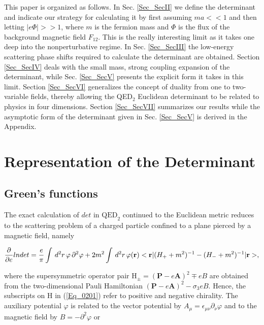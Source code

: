 \documentclass[a4paper,twocolumn,showpacs,preprintnumbers,amsmath,amssymb]{revtex4}
\newcommand{\pdo}[1]{\ensuremath{\frac{\partial }
        {\partial #1 }}}
\begin{document}
This paper is organized as follows. In Sec. \ref{Sec_SecII} we define
the determinant and indicate our strategy for calculating it by first
assuming $ma<<1$ and then letting $|e \Phi| >> 1$, where $m$ is the
fermion mass and $\Phi$ is the flux of the background magnetic field
$F_{12}$. This is the really interesting limit as it takes one deep
into the nonperturbative regime. In Sec. \ref{Sec_SecIII} the
low-energy scattering phase shifts required to calculate the
determinant are obtained. Section \ref{Sec_SecIV} deals with the small
mass, strong coupling expansion of the determinant, while
Sec. \ref{Sec_SecV} presents the explicit form it takes in this
limit. Section \ref{Sec_SecVI} generalizes the concept of duality from
one to two-variable fields, thereby allowing the QED$_2$ Euclidean
determinant to be related to physics in four dimensions. Section
\ref{Sec_SecVII} summarizes our results while the asymptotic form of
the determinant given in Sec. \ref{Sec_SecV} is derived in the
Appendix.




\section{\label{Sec_SecII}
Representation of the Determinant}

\subsection{\label{SubSec_GreenFunc}
Green's functions}

The exact calculation of $det$ in $\text{QED}_2$ continued to the
Euclidean metric reduces to the scattering problem of a charged
particle confined to a plane pierced by a magnetic field,
namely~\cite{Fry93}

\begin{widetext}
\begin{equation}
\label{Eq_0201}
\pdo{e} lndet =
  \frac{e}{\pi}
  \int \, d^2r \, \varphi \, \partial^2 \varphi +
  2 m^2 \int \, d^2r \, \varphi(\textbf{r})\\
  <\textbf{r} | (H_+ + m^2)^{-1} - (H_- + m^2)^{-1}|\textbf{r}>,
\end{equation}
\end{widetext}

\noindent
where the supersymmetric operator pair
$\text{H}_{\pm} = (\textbf{P} - e\textbf{A})^2 \mp eB$ are obtained
from the two-dimensional Pauli Hamiltonian
$(\textbf{P} - e\textbf{A})^2 - \sigma_3 eB$. Hence, the
subscripts on H in (\ref{Eq_0201}) refer to positive and negative
chirality. The auxiliary potential $\varphi$ is related to the vector
potential by $A_{\mu} = \epsilon_{\mu\nu} \partial_\nu \varphi$
and to the magnetic field by $B = - \partial^2 \varphi$ or
\end{document}
